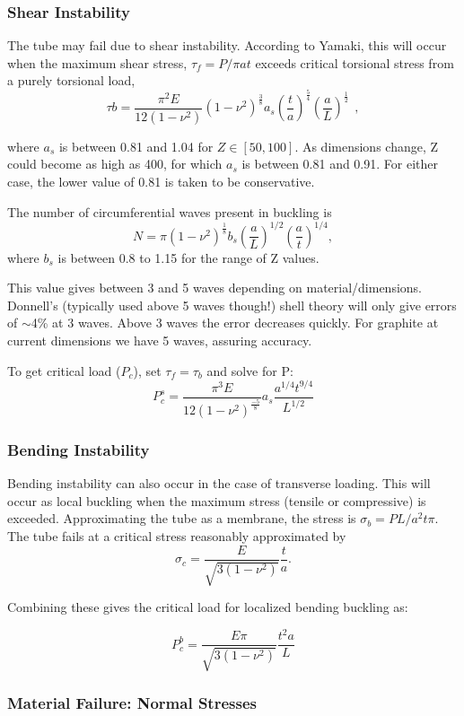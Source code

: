 \documentclass{report}
\begin{document}
\subsubsection{Shear Instability}

The tube may fail due to shear instability. According to Yamaki, this will occur when the maximum shear stress, $\tau_{f} = P/\pi at$ exceeds critical torsional stress from a purely torsional load,
$$
\tau{b} = \frac{\pi^2E}{12(1-\nu^2)}(1-\nu^2)^{\frac{3}{8}}a_s\left(\frac{t}{a}\right)^{\frac{5}{4}}\left(\frac{a}{L}\right)^{\frac{1}{2}}~~,
$$

where $a_{s}$ is between 0.81 and 1.04 for $Z \in [50,100]$. As dimensions change, Z could become as high as 400, for which $a_{s}$ is between 0.81 and 0.91. For either case, the lower value of 0.81 is taken to be conservative.

The number of circumferential waves present in buckling is
$$
N = \pi(1-\nu^2)^{\frac{1}{8}}b_{s}\left(\frac{a}{L}\right)^{1/2}\left(\frac{a}{t}\right)^{1/4},
$$
where $b_{s}$ is between 0.8 to 1.15 for the range of Z values.

This value gives between 3 and 5 waves depending on material/dimensions. Donnell's (typically used above 5 waves though!) shell theory will only give errors of $\sim$4\% at 3 waves. Above 3 waves the error decreases quickly. For graphite at current dimensions we have 5 waves, assuring accuracy.

To get critical load ($P_{c}$), set $\tau_{f} = \tau_{b}$ and solve for P:
$$
P_{c}^{s} = \frac{\pi^3E}{12(1-\nu^2)^{\frac{-5}{8}}}a_{s}\frac{a^{1/4}t^{9/4}}{L^{1/2}}
$$

\subsubsection{Bending Instability}

Bending instability can also occur in the case of transverse loading. This will occur as local buckling when the maximum stress (tensile or compressive) is exceeded. Approximating the tube as a membrane, the stress is $\sigma_{b} = PL/a^2t\pi$. The tube fails at a critical stress reasonably approximated by
$$
\sigma_{c}=\frac{E}{\sqrt{3(1-\nu^2)}}\frac{t}{a}.
$$

Combining these gives the critical load for localized bending buckling as:

$$
P_{c}^{b} = \frac{E \pi}{\sqrt{3(1-\nu^2)}}\frac{t^2a}{L}
$$
\subsubsection{Material Failure: Normal Stresses}
\end{document}
